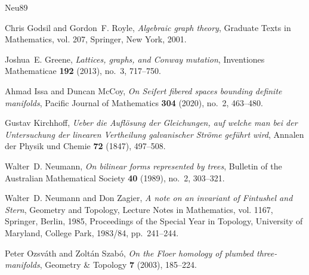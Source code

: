 \documentclass[11pt]{amsart}
\numberwithin{equation}{section}
\def\MR{{\mathcal M}_{\rm R}}
\begin{document}
\providecommand{\bysame}{\leavevmode\hbox to3em{\hrulefill}\thinspace}
\providecommand{\MR}{\relax\ifhmode\unskip\space\fi MR }
\providecommand{\MRhref}[2]{%
  \href{http://www.ams.org/mathscinet-getitem?mr=#1}{#2}
}
\providecommand{\href}[2]{#2}
\begin{thebibliography}{Neu89}

Chris Godsil and Gordon~F. Royle, \emph{Algebraic graph theory}, Graduate Texts
  in Mathematics, vol. 207, Springer, New York, 2001.

Joshua~E. Greene, \emph{Lattices, graphs, and {C}onway mutation}, Inventiones
  Mathematicae \textbf{192} (2013), no.~3, 717--750.

Ahmad Issa and Duncan McCoy, \emph{On {S}eifert fibered spaces bounding
  definite manifolds}, Pacific Journal of Mathematics \textbf{304} (2020),
  no.~2, 463--480.

Gustav Kirchhoff, \emph{{Ueber die Aufl{\"o}sung der Gleichungen, auf welche
  man bei der Untersuchung der linearen Vertheilung galvanischer Str{\"o}me
  gef{\"u}hrt wird}}, Annalen der Physik und Chemie \textbf{72} (1847),
  497--508.

Walter~D. Neumann, \emph{On bilinear forms represented by trees}, Bulletin of
  the Australian Mathematical Society \textbf{40} (1989), no.~2, 303--321.

Walter~D. Neumann and Don Zagier, \emph{A note on an invariant of {F}intushel
  and {S}tern}, Geometry and Topology, Lecture Notes in Mathematics, vol. 1167,
  Springer, Berlin, 1985, Proceedings of the Special Year in Topology,
  University of Maryland, College Park, 1983/84, pp.~241--244.

Peter Ozsv{\'a}th and Zolt{\'a}n Szab{\'o}, \emph{On the {F}loer homology of
  plumbed three-manifolds}, Geometry \& Topology \textbf{7} (2003), 185--224.

\end{thebibliography}
\end{document}

